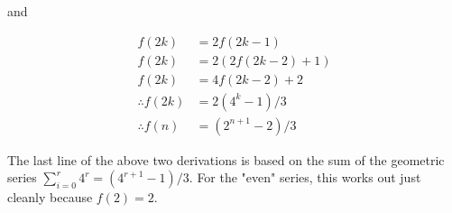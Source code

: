 \documentclass{article}
\begin{document}
and

\begin{align*}
    f(2k) &= 2f(2k - 1) \\
    f(2k) &= 2(2f(2k - 2) + 1) \\
    f(2k) &= 4f(2k - 2) + 2 \\
    \therefore f(2k) &= 2(4^k - 1) / 3 \\
    \therefore f(n) &= (2^{n + 1} - 2) / 3
\end{align*}

The last line of the above two derivations is based on the sum of the geometric series $\sum_{i = 0}^r 4^r = (4^{r + 1} - 1) / 3$. For the "even" series, this works out just cleanly because $f(2) = 2$.
\end{document}
